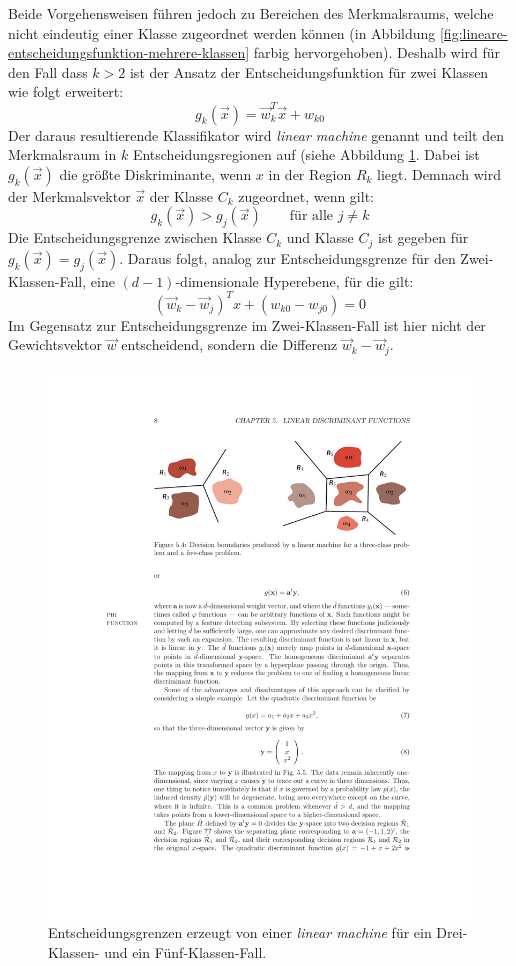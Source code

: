 Beide Vorgehensweisen führen jedoch zu Bereichen des Merkmalsraums, welche nicht eindeutig einer Klasse zugeordnet werden können (in Abbildung \ref{fig:lineare-entscheidungsfunktion-mehrere-klassen} farbig hervorgehoben).
Deshalb wird für den Fall dass $k > 2$ ist der Ansatz der Entscheidungsfunktion für zwei Klassen wie folgt erweitert:
\[
	g_k(\vec{x}) = \vec{w}_k^T\vec{x} + w_{k0}
\]
Der daraus resultierende Klassifikator wird \emph{linear machine} genannt und teilt den Merkmalsraum in $k$ Entscheidungsregionen auf (siehe Abbildung \ref{fig:linear-machine}. Dabei ist $g_k(\vec{x})$ die größte Diskriminante, wenn $x$ in der Region $R_k$ liegt. Demnach wird der Merkmalsvektor $\vec{x}$ der Klasse $C_k$ zugeordnet, wenn gilt:
\[
	g_k(\vec{x}) > g_j(\vec{x}) \qquad \text{für alle } j \ne k
\]
Die Entscheidungsgrenze zwischen Klasse $C_k$ und Klasse $C_j$ ist gegeben für $g_k(\vec{x}) = g_j(\vec{x})$. Daraus folgt, analog zur Entscheidungsgrenze für den Zwei-Klassen-Fall, eine $(d-1)$-dimensionale Hyperebene, für die gilt:
\[
	(\vec{w}_k - \vec{w}_j)^T x + (w_{k0} - w_{j0}) = 0
\]
Im Gegensatz zur Entscheidungsgrenze im Zwei-Klassen-Fall ist hier nicht der Gewichtsvektor $\vec{w}$ entscheidend, sondern die Differenz $\vec{w}_k - \vec{w}_j$.

\begin{figure}[ht!] \centering 
	\includegraphics[width=\linewidth]{figures/ch02_linear-machine.pdf}
	\caption{Entscheidungsgrenzen erzeugt von einer \emph{linear machine} für ein Drei-Klassen- und ein Fünf-Klassen-Fall.}
	\label{fig:linear-machine}
\end{figure}


